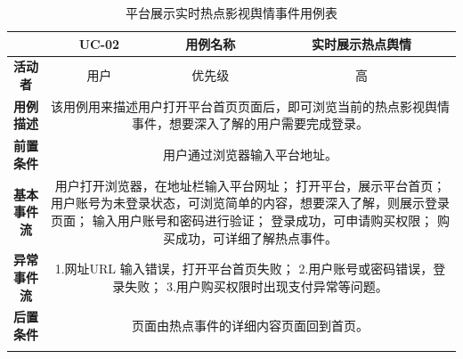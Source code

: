 \begin{longtable}[c]{c|ccc}
	\caption{平台展示实时热点影视舆情事件用例表}
	\label{tab:tab2}\\
	\shline
	\multicolumn{1}{c|}{\textbf{用例编号}} & \multicolumn{1}{c|}{UC-02} & \multicolumn{1}{c|}{用例名称} &  实时展示热点舆情\\ \hline
	\endhead
	\multicolumn{1}{c|}{\textbf{活动者}} & \multicolumn{1}{c|}{用户} & \multicolumn{1}{c|}{优先级} &高  \\ \hline
	\textbf{用例描述} & \multicolumn{3}{p{12cm}}{该用例用来描述用户打开平台首页页面后，即可浏览当前的热点影视舆情事件，想要深入了解的用户需要完成登录。} \\ \hline
	\textbf{前置条件}& \multicolumn{3}{p{12cm}}{用户通过浏览器输入平台地址。} \\ \hline
	\textbf{基本事件流}& \multicolumn{3}{p{12cm}}{用户打开浏览器，在地址栏输入平台网址；\newline
		打开平台，展示平台首页；\newline
		用户账号为未登录状态，可浏览简单的内容，想要深入了解，则展示登录页面；\newline
		输入用户账号和密码进行验证；\newline
		登录成功，可申请购买权限；\newline
		购买成功，可详细了解热点事件。} \\ \hline
	\textbf{异常事件流}& \multicolumn{3}{p{12cm}}{1.网址URL 输入错误，打开平台首页失败；\newline
	    2.用户账号或密码错误，登录失败；\newline
	    3.用户购买权限时出现支付异常等问题。
	} \\ \hline
	\textbf{后置条件}& \multicolumn{3}{p{12cm}}{页面由热点事件的详细内容页面回到首页。} \\ \shline
\end{longtable}

